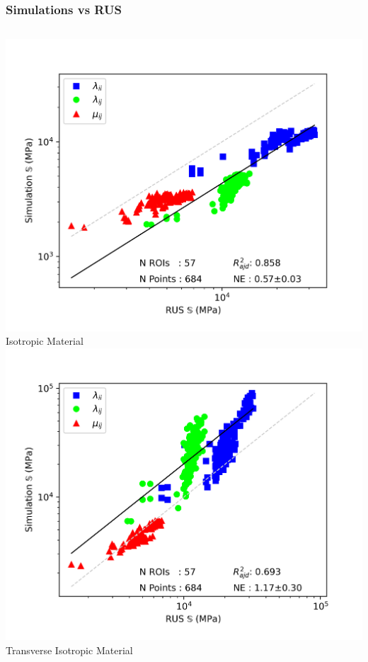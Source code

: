 \documentclass[xcolor=table,11pt]{beamer}
\begin{document}
	\begin{frame}
		\frametitle{Simulations vs RUS}
		\centering
		\begin{columns}
			\centering
			\includegraphics[width=\linewidth]{05_Homogenization/Plots/Elasticity_IsoRUS}\\
			Isotropic Material
			\centering
			\includegraphics[width=\linewidth]{05_Homogenization/Plots/Elasticity_TraRUS}\\
			Transverse Isotropic Material
		\end{columns}
	\end{frame}
\end{document}
